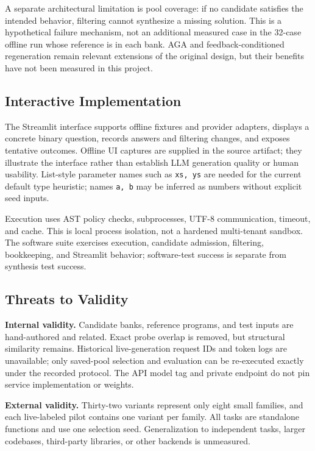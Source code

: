 A separate architectural limitation is pool coverage: if no candidate satisfies the intended behavior, filtering cannot synthesize a missing solution. This is a hypothetical failure mechanism, not an additional measured case in the 32-case offline run whose reference is in each bank. AGA and feedback-conditioned regeneration remain relevant extensions of the original design, but their benefits have not been measured in this project.

\subsection{Interactive Implementation}
The Streamlit interface supports offline fixtures and provider adapters, displays a concrete binary question, records answers and filtering changes, and exposes tentative outcomes. Offline UI captures are supplied in the source artifact; they illustrate the interface rather than establish LLM generation quality or human usability. List-style parameter names such as \texttt{xs, ys} are needed for the current default type heuristic; names \texttt{a, b} may be inferred as numbers without explicit seed inputs.

Execution uses AST policy checks, subprocesses, UTF-8 communication, timeout, and cache. This is local process isolation, not a hardened multi-tenant sandbox. The software suite exercises execution, candidate admission, filtering, bookkeeping, and Streamlit behavior; software-test success is separate from synthesis test success.

\subsection{Threats to Validity}
\textbf{Internal validity.} Candidate banks, reference programs, and test inputs are hand-authored and related. Exact probe overlap is removed, but structural similarity remains. Historical live-generation request IDs and token logs are unavailable; only saved-pool selection and evaluation can be re-executed exactly under the recorded protocol. The API model tag and private endpoint do not pin service implementation or weights.

\textbf{External validity.} Thirty-two variants represent only eight small families, and each live-labeled pilot contains one variant per family. All tasks are standalone functions and use one selection seed. Generalization to independent tasks, larger codebases, third-party libraries, or other backends is unmeasured.

